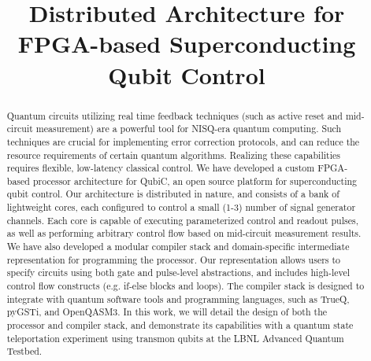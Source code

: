 \documentclass[journal]{IEEEtran}
\begin{document}
\title{Distributed Architecture for FPGA-based Superconducting Qubit Control}
\author{
}


\maketitle

\begin{abstract}

 Quantum circuits utilizing real time feedback techniques (such as active reset and mid-circuit measurement) are a powerful tool for NISQ-era quantum computing. Such techniques are crucial for implementing error correction protocols, and can reduce the resource requirements of certain quantum algorithms. Realizing these capabilities requires flexible, low-latency classical control. We have developed a custom FPGA-based processor architecture for QubiC, an open source platform for superconducting qubit control. Our architecture is distributed in nature, and consists of a bank of lightweight cores, each configured to control a small (1-3) number of signal generator channels. Each core is capable of executing parameterized control and readout pulses, as well as performing arbitrary control flow based on mid-circuit measurement results. We have also developed a modular compiler stack and domain-specific intermediate representation for programming the processor. Our representation allows users to specify circuits using both gate and pulse-level abstractions, and includes high-level control flow constructs (e.g. if-else blocks and loops). The compiler stack is designed to integrate with quantum software tools and programming languages, such as TrueQ, pyGSTi, and OpenQASM3. In this work, we will detail the design of both the processor and compiler stack, and demonstrate its capabilities with a quantum state teleportation experiment using transmon qubits at the LBNL Advanced Quantum Testbed. 

\end{abstract}


\IEEEpeerreviewmaketitle
\end{document}
